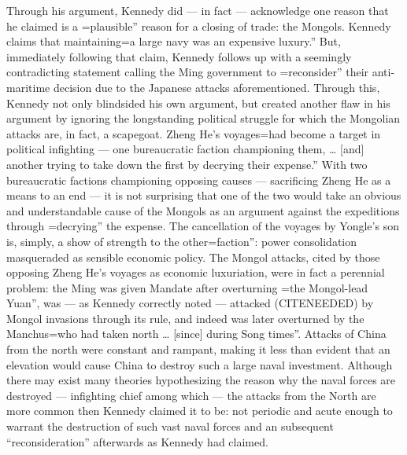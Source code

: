 \documentclass[letterpaper]{article}
\begin{document}
Through his argument, Kennedy did --- in fact --- acknowledge one reason
that he claimed is a
=plausible'' reason for a closing of trade: the Mongols. Kennedy claims that maintaining=a
large navy was an expensive luxury.'' But, immediately following that
claim, Kennedy follows up with a seemingly contradicting statement
calling the Ming government to
=reconsider'' their anti-maritime decision due to the Japanese attacks aforementioned. Through this, Kennedy not only blindsided his own argument, but created another flaw in his argument by ignoring the longstanding political struggle for which the Mongolian attacks are, in fact, a scapegoat. Zheng He's voyages=had
become a target in political infighting --- one bureaucratic faction
championing them, \ldots{} [and] another trying to take down the first by
decrying their expense.'' With two bureaucratic factions championing
opposing causes --- sacrificing Zheng He as a means to an end --- it is
not surprising that one of the two would take an obvious and
understandable cause of the Mongols as an argument against the
expeditions through
=decrying'' the expense. The cancellation of the voyages by Yongle's son is, simply, a show of strength to the other=faction'':
power consolidation masqueraded as sensible economic policy. The Mongol
attacks, cited by those opposing Zheng He's voyages as economic
luxuriation, were in fact a perennial problem: the Ming was given
Mandate after overturning
=the Mongol-lead Yuan'', was --- as Kennedy correctly noted --- attacked (CITENEEDED) by Mongol invasions through its rule, and indeed was later overturned by the Manchus=who
had taken north \ldots{} [since] during Song times''. Attacks of China from
the north were constant and rampant, making it less than evident that an
elevation would cause China to destroy such a large naval investment.
Although there may exist many theories hypothesizing the reason why the
naval forces are destroyed --- infighting chief among which --- the
attacks from the North are more common then Kennedy claimed it to be:
not periodic and acute enough to warrant the destruction of such vast
naval forces and an subsequent ``reconsideration'' afterwards as Kennedy
had claimed.
\end{document}
